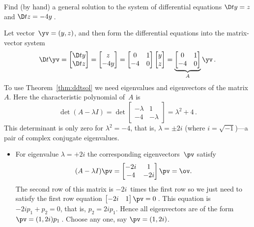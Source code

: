 \begin{example} \label{eg:decis2t} 
Find (by hand) a general solution to the system of differential equations
\(\D ty=z\) and \(\D tz=-4y\)\,.
\begin{solution} 
Let vector~\(\yv=(y,z)\), and then form the differential equations into the matrix-vector system
\begin{equation*}
\D t\yv=\begin{bmatrix} \D ty\\\D tz \end{bmatrix}
=\begin{bmatrix} z\\-4y \end{bmatrix}
=\begin{bmatrix} 0&1\\-4&0 \end{bmatrix}
\begin{bmatrix} y\\z \end{bmatrix}
=\underbrace{\begin{bmatrix} 0&1\\-4&0 \end{bmatrix}}_A\yv\,.
\end{equation*}
To use Theorem~\ref{thm:ddtsol} we need eigenvalues and eigenvectors of the matrix~\(A\).
Here the characteristic polynomial of~\(A\) is
\begin{equation*}
\det(A-\lambda I)=\det\begin{bmatrix} -\lambda&1\\-4&-\lambda \end{bmatrix}
=\lambda^2+4\,.
\end{equation*}
This determinant is only zero for \(\lambda^2=-4\), that is, \(\lambda=\pm2i\) (where \(i=\sqrt{-1}\))---a pair of complex conjugate eigenvalues.
\begin{itemize}
\item For eigenvalue \(\lambda=+2i\) the corresponding eigenvectors~\(\pv\) satisfy
\begin{equation*}
(A-\lambda I)\pv=\begin{bmatrix} -2i&1\\-4&-2i \end{bmatrix}\pv
=\ov.
\end{equation*}
The second row of this matrix is \(-2i\)~times the first row so we just need to satisfy the first row equation \(\begin{bmatrix} -2i&1 \end{bmatrix}\pv=0\)\,.
This equation is \(-2ip_1+p_2=0\), that is, \(p_2=2ip_1\).
Hence all eigenvectors are of the form \(\pv=(1,2i)p_1\)\,.
Choose any one, say \(\pv=(1,2i)\).


\end{itemize}
\end{solution}
\end{example}
